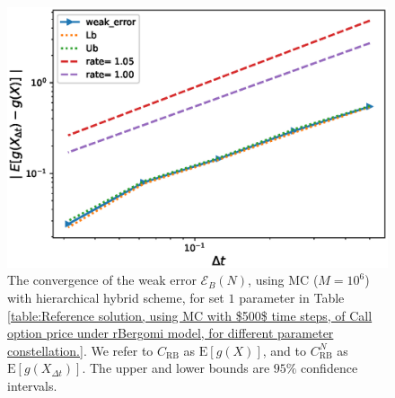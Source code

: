 \documentclass[11pt]{article}
\newcommand{\expt}[1]{\mathrm{E}\left[#1\right]}
\begin{document}
\FloatBarrier
\begin{figure}[h!]
	\centering
		\includegraphics[width=0.6\linewidth]{./figures/rBergomi_weak_error_rates/without_richardson/H_007/weak_convergence_order_Bergomi_H_007_K_1_M_10_6_CI_relative}
		
	\caption{The  convergence of the weak error $\mathcal{E}_B(N)$, using MC ($M=10^6$) with hierarchical hybrid scheme, for set $1$ parameter in Table \ref{table:Reference solution, using MC with $500$ time steps, of Call option price under rBergomi model, for different parameter constellation.}. We refer to $C_{\text{RB}}$ as $\expt{g(X)}$, and to $C_{\text{RB}}^{N}$ as  $\expt{g(X_{\Delta t})}$. The upper and lower bounds are $95\%$ confidence intervals.}
	\label{fig:Weak_rate_set1_without_rich_hybrid}
\end{figure}
\FloatBarrier
\end{document}
